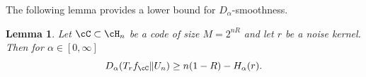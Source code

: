 \documentclass{amsart}
\newtheorem{lemma}[theorem]{Lemma}
\theoremstyle{remark}
\begin{document}



The following lemma provides a lower bound for $D_{\alpha}$-smoothness.

\begin{lemma}\label{lemma: D_q(T_r|U) impos}
    Let $\cC\subset\cH_n$ be a code of size $M=2^{nR}$ and let $r$ be a noise kernel. Then for $\alpha \in [0,\infty]$
    \begin{equation*}
        D_{\alpha}(T_rf_\cC\|U_n) \geq  n(1-R)-H_{\alpha}(r).
    \end{equation*}
\end{lemma}
\end{document}
